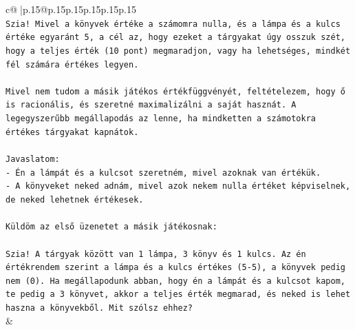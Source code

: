 \documentclass{article}
\begin{document}
{\begin{supertabular}{c@{$\;$}|p{.15\linewidth}@{}p{.15\linewidth}p{.15\linewidth}p{.15\linewidth}p{.15\linewidth}p{.15\linewidth}}
{{{\\ 
\texttt{Szia! Mivel a könyvek értéke a számomra nulla, és a lámpa és a kulcs értéke egyaránt 5, a cél az, hogy ezeket a tárgyakat úgy osszuk szét, hogy a teljes érték (10 pont) megmaradjon, vagy ha lehetséges, mindkét fél számára értékes legyen.} \\
\\ 
\texttt{Mivel nem tudom a másik játékos értékfüggvényét, feltételezem, hogy ő is racionális, és szeretné maximalizálni a saját hasznát. A legegyszerűbb megállapodás az lenne, ha mindketten a számotokra értékes tárgyakat kapnátok.} \\
\\ 
\texttt{Javaslatom:} \\
\texttt{{-} Én a lámpát és a kulcsot szeretném, mivel azoknak van értékük.} \\
\texttt{{-} A könyveket neked adnám, mivel azok nekem nulla értéket képviselnek, de neked lehetnek értékesek.} \\
\\ 
\texttt{Küldöm az első üzenetet a másik játékosnak:} \\
\\ 
\texttt{Szia! A tárgyak között van 1 lámpa, 3 könyv és 1 kulcs. Az én értékrendem szerint a lámpa és a kulcs értékes (5{-}5), a könyvek pedig nem (0). Ha megállapodunk abban, hogy én a lámpát és a kulcsot kapom, te pedig a 3 könyvet, akkor a teljes érték megmarad, és neked is lehet haszna a könyvekből. Mit szólsz ehhez?} \\
            }
        }
    }
    & \\ \\


\end{supertabular}}
\end{document}
